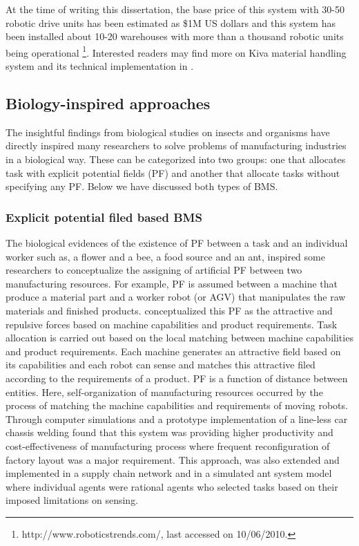 At the  time of writing this dissertation,  the base price of this system with 30-50 robotic drive units has been estimated as \$1M US dollars and this system has been installed about 10-20 warehouses with more than a thousand robotic units being operational \footnote{http://www.roboticstrends.com/, last accessed on 10/06/2010.}.  Interested readers may find more on Kiva material handling system and its technical implementation in .
\subsection{Biology-inspired approaches}
The insightful findings from biological studies on insects and organisms have directly inspired many researchers to solve problems of manufacturing industries in a biological way. These can be categorized into two groups: one that allocates task with explicit potential fields (PF) and another that allocate tasks without specifying any PF. Below we have discussed both types of BMS.
\subsubsection*{Explicit potential filed based BMS}
The biological evidences of the existence of PF between a task and an individual worker such as, a flower and a bee, a food source and an ant, inspired some researchers to conceptualize the assigning of artificial PF between two manufacturing resources. For example, PF is assumed between a machine that produce a material part and a worker robot (or AGV) that manipulates the raw materials and finished products. \cite{Ueda2006} conceptualized this PF as the attractive and repulsive forces based on machine capabilities and product requirements. Task allocation is carried out based on the local matching between machine capabilities and product requirements. Each machine generates an attractive field based on its capabilities and each robot can sense and matches this attractive filed according to the requirements of a product. PF is a function of distance between entities. Here, self-organization of manufacturing resources occurred by the process of matching the machine capabilities and requirements of moving robots. Through computer simulations and a prototype implementation of a line-less car chassis welding \cite{Ueda2006} found that this system was providing higher productivity and cost-effectiveness of manufacturing process where frequent reconfiguration of factory layout was a major requirement. This approach, was also extended and implemented in a supply chain network and in a simulated ant system model where individual agents were rational agents who selected tasks based on their imposed limitations on sensing. 
